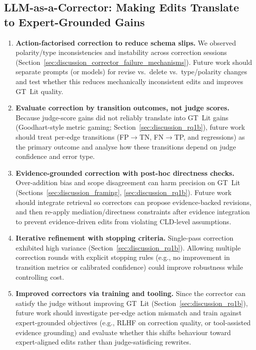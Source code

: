 \subsection{LLM-as-a-Corrector: Making Edits Translate to Expert-Grounded Gains}
\begin{enumerate}[noitemsep]
    \item \textbf{Action-factorised correction to reduce schema slips.} We observed polarity/type inconsistencies and instability across correction sessions (Section~\ref{sec:discussion_corrector_failure_mechanisms}). Future work should separate prompts (or models) for revise vs.\ delete vs.\ type/polarity changes and test whether this reduces mechanically inconsistent edits and improves GT~Lit quality.
    \item \textbf{Evaluate correction by transition outcomes, not judge scores.} Because judge-score gains did not reliably translate into GT~Lit gains (Goodhart-style metric gaming; Section~\ref{sec:discussion_rq1b}), future work should treat per-edge transitions (FP$\rightarrow$TN, FN$\rightarrow$TP, and regressions) as the primary outcome and analyse how these transitions depend on judge confidence and error type.
    \item \textbf{Evidence-grounded correction with post-hoc directness checks.} Over-addition bias and scope disagreement can harm precision on GT~Lit (Sections~\ref{sec:discussion_framing}, \ref{sec:discussion_rq1b}). Future work should integrate retrieval so correctors can propose evidence-backed revisions, and then re-apply mediation/directness constraints after evidence integration to prevent evidence-driven edits from violating CLD-level assumptions.
    \item \textbf{Iterative refinement with stopping criteria.} Single-pass correction exhibited high variance (Section~\ref{sec:discussion_rq1b}). Allowing multiple correction rounds with explicit stopping rules (e.g., no improvement in transition metrics or calibrated confidence) could improve robustness while controlling cost.
    \item \textbf{Improved correctors via training and tooling.} Since the corrector can satisfy the judge without improving GT~Lit (Section~\ref{sec:discussion_rq1b}), future work should investigate per-edge action mismatch and train against expert-grounded objectives (e.g., RLHF on correction quality, or tool-assisted evidence grounding) and evaluate whether this shifts behaviour toward expert-aligned edits rather than judge-satisficing rewrites.
\end{enumerate}

